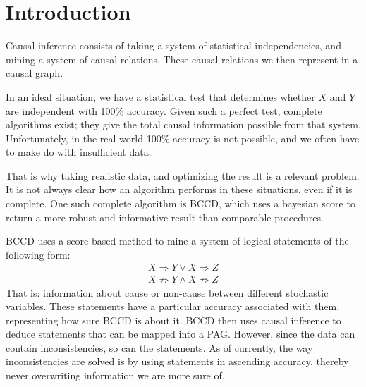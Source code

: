 \documentclass[11pt,a4paper]{report}
\theoremstyle{definition}
\begin{document}
\tableofcontents

\chapter{Introduction}\label{introduction}
Causal inference consists of taking a system of statistical
independencies, and mining a system of causal relations. These causal
relations we then represent in a causal graph.

In an ideal situation, we have a statistical test that determines
whether $X$ and $Y$ are independent with 100\% accuracy. Given such a
perfect test, complete algorithms exist; they give the total causal
information possible from that system. Unfortunately, in the real world
100\% accuracy is not possible, and we often have to make do with
insufficient data.

That is why taking realistic data, and optimizing the result is a relevant
problem. It is not always clear how an algorithm performs in these
situations, even if it is complete. One such complete algorithm is
BCCD\cite{claassenBayesianApproachConstraint2012}, which uses a bayesian
score to return a more robust and informative result than comparable
procedures.

BCCD uses a score-based method to mine a system of logical statements of
the following form:
\begin{align*}
  X \Rightarrow Y \lor X \Rightarrow Z \\
  X \not \Rightarrow Y \land X \not \Rightarrow Z
\end{align*}
That is: information about cause or non-cause between different stochastic
variables. These statements have a particular accuracy associated with
them, representing how sure BCCD is about it. BCCD then uses causal
inference to deduce statements that can be mapped into a PAG. However,
since the data can contain inconsistencies, so can the statements. As of
currently, the way inconsistencies are solved is by using statements in
ascending accuracy, thereby never overwriting information we are more sure
of.
\end{document}
